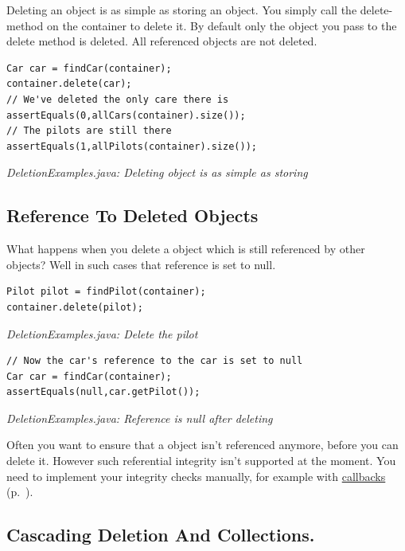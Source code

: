 Deleting an object is as simple as storing an object. You simply call the delete-method on the container to delete it. By default only the object you pass to the delete method is deleted. All referenced objects are not deleted.

\begin{lstlisting}
Car car = findCar(container);
container.delete(car);
// We've deleted the only care there is
assertEquals(0,allCars(container).size());
// The pilots are still there
assertEquals(1,allPilots(container).size());
\end{lstlisting}

{\small\itshape DeletionExamples.java: Deleting object is as simple as storing\par}
\medskip

\subsection*{Reference To Deleted Objects}

What happens when you delete a object which is still referenced by other objects? Well in such cases that reference is set to null.

\begin{lstlisting}
Pilot pilot = findPilot(container);
container.delete(pilot);
\end{lstlisting}

{\small\itshape DeletionExamples.java: Delete the pilot\par}
\medskip

\begin{lstlisting}
// Now the car's reference to the car is set to null
Car car = findCar(container);
assertEquals(null,car.getPilot());
\end{lstlisting}

{\small\itshape DeletionExamples.java: Reference is null after deleting\par}
\medskip

Often you want to ensure that a object isn't referenced anymore, before you can delete it. However such referential integrity isn't supported at the moment. You need to implement your integrity checks manually, for example with \hyperref[ref:advanced-topics-callbacks]{callbacks} (p.~\pageref{ref:advanced-topics-callbacks}).

\subsection*{Cascading Deletion And Collections.}

